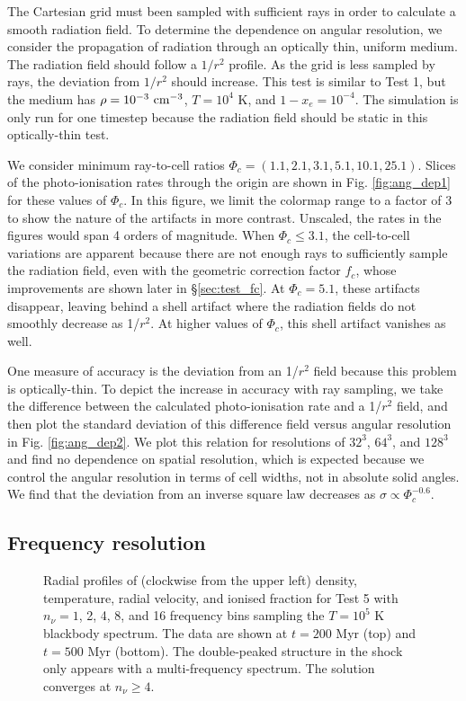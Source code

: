 \documentclass[useAMS,usenatbib]{mn2e}
\begin{document}
The Cartesian grid must been sampled with sufficient rays in order to
calculate a smooth radiation field.  To determine the dependence on
angular resolution, we consider the propagation of radiation through
an optically thin, uniform medium.  The radiation field should follow
a $1/r^2$ profile.  As the grid is less sampled by rays, the deviation
from $1/r^2$ should increase.  This test is similar to Test 1, but the
medium has $\rho = 10^{-3}~\cubecm$, $T = 10^4$ K, and $1 - x_e =
10^{-4}$.  The simulation is only run for one timestep because the
radiation field should be static in this optically-thin test.

We consider minimum ray-to-cell ratios $\Phi_c = (1.1, 2.1, 3.1, 5.1,
10.1, 25.1)$.  Slices of the photo-ionisation rates through the origin
are shown in Fig. \ref{fig:ang_dep1} for these values of $\Phi_c$.
In this figure, we limit the colormap range to a factor of 3 to show
the nature of the artifacts in more contrast.  Unscaled, the rates in
the figures would span 4 orders of magnitude.  When $\Phi_c \le 3.1$,
the cell-to-cell variations are apparent because there are not enough
rays to sufficiently sample the radiation field, even with the
geometric correction factor $f_c$, whose improvements are shown later
in \S\ref{sec:test_fc}.  At $\Phi_c = 5.1$, these artifacts disappear,
leaving behind a shell artifact where the radiation fields do not
smoothly decrease as 1/$r^2$.  At higher values of $\Phi_c$, this
shell artifact vanishes as well.  

One measure of accuracy is the deviation from an 1/$r^2$ field because
this problem is optically-thin.  To depict the increase in accuracy
with ray sampling, we take the difference between the calculated
photo-ionisation rate and a 1/$r^2$ field, and then plot the standard
deviation of this difference field versus angular resolution in Fig.
\ref{fig:ang_dep2}.  We plot this relation for resolutions of $32^3$,
$64^3$, and $128^3$ and find no dependence on spatial resolution,
which is expected because we control the angular resolution in terms
of cell widths, not in absolute solid angles.  We find that the
deviation from an inverse square law decreases as $\sigma \propto
\Phi_c^{-0.6}$.

\subsection{Frequency resolution}
\label{sec:nu_dep}

\begin{figure}
  \caption{\label{fig:nu_dep} Radial profiles of (clockwise from the
    upper left) density, temperature, radial velocity, and ionised
    fraction for Test 5 with $n_\nu = 1$, 2, 4, 8, and 16 frequency
    bins sampling the $T=10^5$ K blackbody spectrum.  The data are
    shown at $t = 200$ Myr (top) and $t = 500$ Myr (bottom).  The
    double-peaked structure in the shock only appears with a
    multi-frequency spectrum.  The solution converges at $n_\nu \ge
    4$.}
\end{figure}
\end{document}

